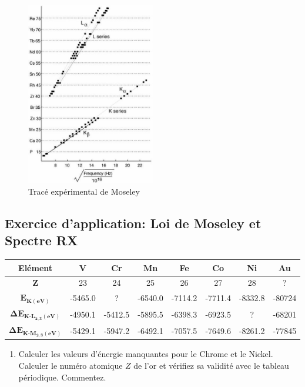 \documentclass{article}
\begin{document}
\begin{figure}[ht]
    \centering
    \includegraphics[width=0.5\textwidth]{Fig/Moseley.jpg}
    \caption{Tracé expérimental de Moseley}
    \label{fig:Moseley}
\end{figure}


\newpage
\subsection*{Exercice d'application: Loi de Moseley et Spectre RX}

\vspace{5mm}
\begin{tabular}{|c|c|c|c|c|c|c|c|}
    \hline
    \textbf{Elément} & \textbf{V} & \textbf{Cr} & \textbf{Mn} & \textbf{Fe} & \textbf{Co} & \textbf{Ni} & \textbf{Au} \\ \hline
    \textbf{Z} & 23 & 24 & 25 & 26 & 27 & 28 & ? \\ \hline
    $\bm{E_{K(eV)}}$ & -5465.0 & ? & -6540.0 & -7114.2 & -7711.4 & -8332.8 & -80724 \\ \hline
    $\bm{\Delta E_{K\text{-}L_{2,3}(eV)}}$ & -4950.1 & -5412.5 & -5895.5 & -6398.3 & -6923.5 & ? & -68201 \\ \hline
    $\bm{\Delta E_{K\text{-}M_{2,3}(eV)}}$ & -5429.1 & -5947.2 & -6492.1 & -7057.5 & -7649.6 & -8261.2 & -77845 \\ \hline
\end{tabular}
\vspace{5mm}
\begin{enumerate}
    \item Calculer les valeurs d'énergie manquantes pour le Chrome et le Nickel. Calculer le numéro atomique $Z$ de l'or et vérifiez sa validité avec le tableau périodique. Commentez.
\end{enumerate}
\end{document}
